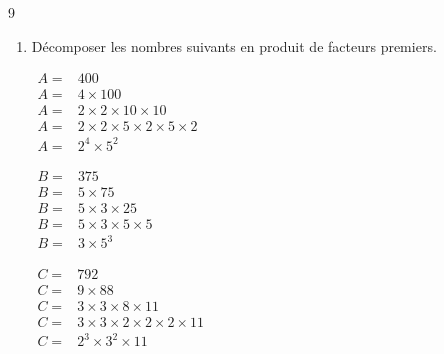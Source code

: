 \documentclass[a4paper]{book}
\begin{document}
{\begin{exerciceNote}{9}
\begin{enumerate}[leftmargin=*]
            \medskip

            \item Décomposer les nombres suivants en produit de facteurs premiers.

            \begin{minipage}{0.30\linewidth}
                $\begin{array}{ll}
                    A = & 400 \\[1ex]
                    A = & 4\times 100\\[1ex]
                    A = & 2\times2\times10\times10\\[1ex]
                    A = & 2\times2\times5\times2\times5\times2\\[1ex]
                    A = & 2^4\times5^2
                \end{array}$
    
            \end{minipage}
            \hfill
            \begin{minipage}{0.30\linewidth}
                $\begin{array}{ll}
                    B = & 375 \\[1ex]
                    B = & 5 \times 75  \\[1ex]
                    B = & 5 \times 3 \times 25 \\[1ex]
                    B = & 5 \times 3 \times 5 \times 5 \\[1ex]
                    B = & 3 \times 5^3
                \end{array}$    
            \end{minipage}
            \hfill
            \begin{minipage}[t]{0.30\linewidth}
                $\begin{array}{ll}
                    C = & 792 \\[1ex]
                    C = & 9\times 88 \\[1ex]
                    C = & 3 \times 3 \times 8 \times 11 \\[1ex]
                    C = & 3 \times 3 \times 2 \times 2 \times 2 \times 11 \\[1ex]
                    C = & 2^3\times 3^2 \times 11 
                \end{array}$
            \end{minipage}
        \end{enumerate}
    \end{exerciceNote}


}
\end{document}
